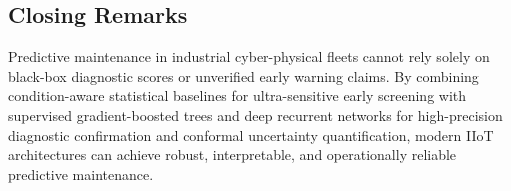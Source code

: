 \subsection{Closing Remarks}
Predictive maintenance in industrial cyber-physical fleets cannot rely solely on black-box diagnostic scores or unverified early warning claims. By combining condition-aware statistical baselines for ultra-sensitive early screening with supervised gradient-boosted trees and deep recurrent networks for high-precision diagnostic confirmation and conformal uncertainty quantification, modern IIoT architectures can achieve robust, interpretable, and operationally reliable predictive maintenance.
